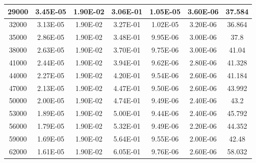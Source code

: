 \documentclass[11pt, a4paper, twocolumn]{article}
\begin{document}
\begin{table}[H]
{\begin{tabular}{|c|c|c|c|c|c|c|}
29000          & 3.45E-05               & 1.90E-02                      & 3.06E-01        & 1.05E-05            & 3.60E-06     & 37.584      \\ \hline
32000          & 3.13E-05               & 1.90E-02                      & 3.27E-01        & 1.02E-05            & 3.20E-06     & 36.864      \\ \hline
35000          & 2.86E-05               & 1.90E-02                      & 3.48E-01        & 9.95E-06            & 3.00E-06     & 37.8        \\ \hline
38000          & 2.63E-05               & 1.90E-02                      & 3.70E-01        & 9.75E-06            & 3.00E-06     & 41.04       \\ \hline
41000          & 2.44E-05               & 1.90E-02                      & 3.94E-01        & 9.62E-06            & 2.80E-06     & 41.328      \\ \hline
44000          & 2.27E-05               & 1.90E-02                      & 4.20E-01        & 9.54E-06            & 2.60E-06     & 41.184      \\ \hline
47000          & 2.13E-05               & 1.90E-02                      & 4.47E-01        & 9.50E-06            & 2.60E-06     & 43.992      \\ \hline
50000          & 2.00E-05               & 1.90E-02                      & 4.74E-01        & 9.49E-06            & 2.40E-06     & 43.2        \\ \hline
53000          & 1.89E-05               & 1.90E-02                      & 5.00E-01        & 9.44E-06            & 2.40E-06     & 45.792      \\ \hline
56000          & 1.79E-05               & 1.90E-02                      & 5.32E-01        & 9.49E-06            & 2.20E-06     & 44.352      \\ \hline
59000          & 1.69E-05               & 1.90E-02                      & 5.64E-01        & 9.55E-06            & 2.00E-06     & 42.48       \\ \hline
62000          & 1.61E-05               & 1.90E-02                      & 6.05E-01        & 9.76E-06            & 2.60E-06     & 58.032      \\ \hline
\end{tabular}%
}
\end{table}



\end{document}
